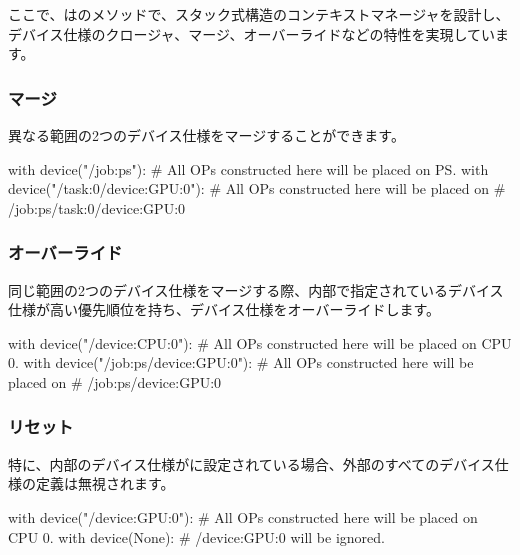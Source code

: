 \begin{content}
ここで、はのメソッドで、スタック式構造のコンテキストマネージャを設計し、デバイス仕様のクロージャ、マージ、オーバーライドなどの特性を実現しています。

\subsubsection{マージ}

異なる範囲の2つのデバイス仕様をマージすることができます。

\begin{leftbar}
\begin{python}
with device("/job:ps"):
  # All OPs constructed here will be placed on PS.
  with device("/task:0/device:GPU:0"):
    # All OPs constructed here will be placed on
    # /job:ps/task:0/device:GPU:0
\end{python}
\end{leftbar}

\subsubsection{オーバーライド}

同じ範囲の2つのデバイス仕様をマージする際、内部で指定されているデバイス仕様が高い優先順位を持ち、デバイス仕様をオーバーライドします。

\begin{leftbar}
\begin{python}
with device("/device:CPU:0"):
  # All OPs constructed here will be placed on CPU 0.
  with device("/job:ps/device:GPU:0"):
    # All OPs constructed here will be placed on
    # /job:ps/device:GPU:0
\end{python}
\end{leftbar}

\subsubsection{リセット}

特に、内部のデバイス仕様がに設定されている場合、外部のすべてのデバイス仕様の定義は無視されます。

\begin{leftbar}
\begin{python}
with device("/device:GPU:0"):
  # All OPs constructed here will be placed on CPU 0.
  with device(None):
    # /device:GPU:0 will be ignored.
\end{python}
\end{leftbar}


\end{content}

